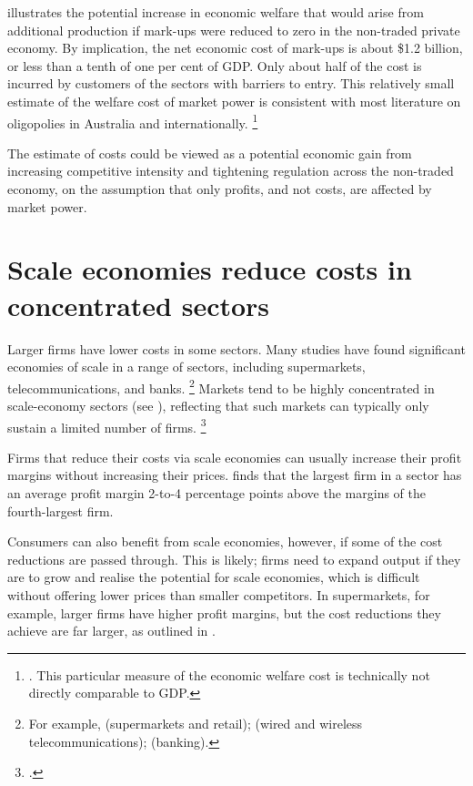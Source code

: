  illustrates the potential increase in economic welfare that would arise from additional production if mark-ups were reduced to zero in the non-traded private economy.
By implication, the net economic cost of mark-ups is about \$1.2 billion, or less than a tenth of one per cent of GDP\@. Only about half of the cost is incurred by customers of the sectors with barriers to entry. This relatively small estimate of the welfare cost of market power is consistent with most literature on oligopolies in Australia and internationally.%
    \footnote{\textcites{harberger1954monopoly}{worcester1973new}{hefford1978welfare}{ritz2016oligopolistic}. This particular measure of the economic welfare cost is technically not directly comparable to GDP\@.}

The estimate of costs could be viewed as a potential economic gain from increasing competitive intensity and tightening regulation across the non-traded economy, on the assumption that only profits, and not costs, are affected by market power.

\clearpage
\section{Scale economies reduce costs in concentrated sectors}

Larger firms have lower costs in some sectors.
Many studies have found significant economies of scale in a range of sectors, including supermarkets, telecommunications, and banks.%
    \footnote{For example, \textcites{ellickson2007does}{keh2003retail}{guy2005scale} (supermarkets and retail); \textcites{bloch2001economies}{nam2009estimating} (wired and wireless telecommunications); \textcites{allen2007efficiency}{hughes2013said} (banking).}
Markets tend to be highly concentrated in scale-economy sectors (see ), reflecting that such markets can typically only sustain a limited number of firms.%
    \footcite{shaked-sutton1983natural-oligopolies}

Firms that reduce their costs via scale economies can usually increase their profit margins without increasing their prices.
 finds that the largest firm in a sector has an average profit margin 2-to-4 percentage points above the margins of the fourth-largest firm.

Consumers can also benefit from scale economies, however, if some of the cost reductions are passed through.
This is likely; firms need to expand output if they are to grow and realise the potential for scale economies, which is difficult without offering lower prices than smaller competitors.
In supermarkets, for example, larger firms have higher profit margins, but the cost reductions they achieve are far larger, as outlined in .

